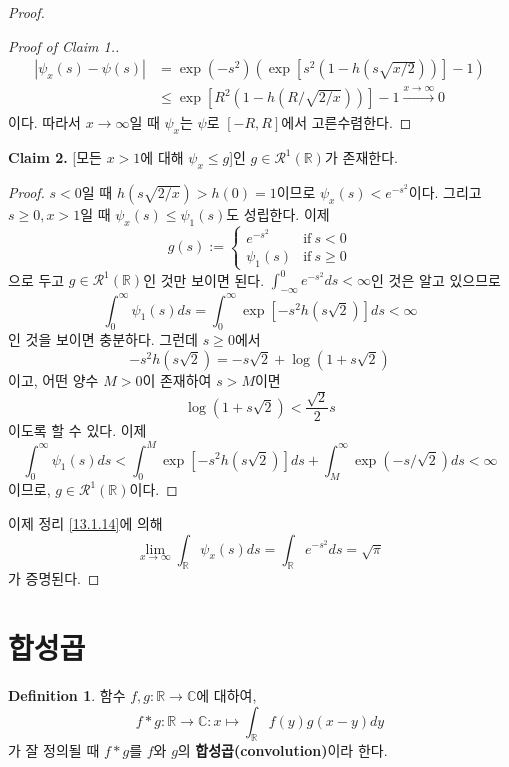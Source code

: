 \documentclass[11pt]{book}
\numberwithin{equation}{chapter}
\def\RR{\mathbb{R}}
\def\CC{\mathbb{C}}
\def\calR{\mathcal{R}}
\newcommand{\abs}[1]{\left\vert#1\right\vert}
\def\textif{\text{if}}
\theoremstyle{definition}
\newtheorem{defn}[thm]{Definition}
\begin{document}
\begin{proof}
\begin{proof}[Proof of Claim 1.]
        \begin{align*}
            \abs{\psi_x(s) - \psi(s)} &= \exp(-s^2) (\exp[s^2(1 - h(s\sqrt{x/2}))] -1)\\
            &\le \exp[R^2(1 - h(R/\sqrt{2/x}))] - 1 \xrightarrow[]{x \to \infty} 0
        \end{align*}
        이다. 따라서 \(x \to \infty\)일 때 \(\psi_x\)는 \(\psi\)로 \([-R, R]\)에서 고른수렴한다.
    \end{proof}
    \noindent\textbf{Claim 2.} [모든 \(x > 1\)에 대해 \(\psi_x \le g\)]인 \(g \in \calR^1(\RR)\)가 존재한다.
    \begin{proof}
        \(s < 0\)일 때 \(h(s \sqrt{2/x}) > h(0) = 1\)이므로 \(\psi_x(s) < e^{-s^2}\)이다. 그리고 \(s \ge 0, x > 1\)일 때 \(\psi_x(s) \le \psi_1(s)\)도 성립한다. 이제
        \[
        g(s) :=
        \begin{cases}
            e^{-s^2} &\textif \ s < 0\\
            \psi_1(s) &\textif \ s \ge 0
        \end{cases}    
        \]
        으로 두고 \(g \in \calR^1(\RR)\)인 것만 보이면 된다. \(\int_{-\infty}^0 e^{-s^2} ds < \infty\)인 것은 알고 있으므로
        \[
        \int_0^\infty \psi_1(s) ds = \int_0^\infty \exp[-s^2h(s\sqrt{2})] ds  < \infty    
        \]
        인 것을 보이면 충분하다. 그런데 \(s \ge 0\)에서
        \[
            -s^2h(s\sqrt{2}) = -s \sqrt{2} + \log (1 + s\sqrt{2})
        \]
        이고, 어떤 양수 \(M > 0\)이 존재하여 \(s > M\)이면
        \[
            \log (1 + s\sqrt{2}) < \frac{\sqrt{2}}{2}s
        \]
        이도록 할 수 있다. 이제
        \[
        \int_0^\infty \psi_1(s) ds < \int_0^M \exp[-s^2h(s\sqrt{2})] ds + \int_M^\infty \exp(-s/\sqrt{2}) ds < \infty
        \]
        이므로, \(g \in \calR^1(\RR)\)이다.
    \end{proof}
    이제 정리 \ref{13.1.14}에 의해
    \[
        \lim_{x \to \infty} \int_\RR \psi_x(s) ds = \int_{\RR} e^{-s^2} ds = \sqrt{\pi}
    \]
    가 증명된다.
\end{proof}

\section{합성곱}

\begin{defn}
    함수 \(f, g : \RR \to \CC\)에 대하여,
    \[
    f * g : \RR \to \CC : x \mapsto \int_\RR f(y)g(x-y) dy    
    \]
    가 잘 정의될 때 \(f * g\)를 \(f\)와 \(g\)의 \textbf{합성곱(convolution)}이라 한다.
\end{defn}
\end{document}
